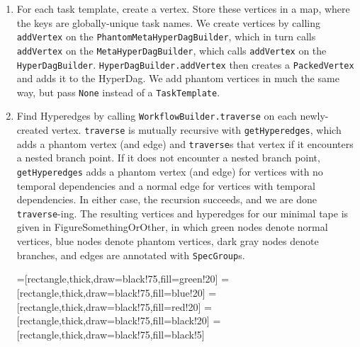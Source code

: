 \documentclass{report}
\begin{document}
\begin{enumerate}

\item For each task template, create a vertex. Store these vertices in a map, where the keys are globally-unique task names.
      We create vertices by calling \texttt{addVertex} on the \texttt{PhantomMetaHyperDagBuilder}, which in turn calls \texttt{addVertex}
      on the \texttt{MetaHyperDagBuilder}, which calls \texttt{addVertex} on the \texttt{HyperDagBuilder}. \texttt{HyperDagBuilder.addVertex}
      then creates a \texttt{PackedVertex} and adds it to the HyperDag. We add phantom vertices in much the same way, but pass \texttt{None}
      instead of a \texttt{TaskTemplate}.

\item Find Hyperedges by calling \texttt{WorkflowBuilder.traverse} on each newly-created vertex. \texttt{traverse} is mutually recursive with
      \texttt{getHyperedges}, which adds a phantom vertex (and edge) and \texttt{traverse}s that vertex if it encounters a
      nested branch point. If it does not encounter a nested branch point, \texttt{getHyperedges} adds a phantom vertex (and
      edge) for vertices with no temporal dependencies and a normal edge for vertices with temporal dependencies. In either
      case, the recursion succeeds, and we are done \texttt{traverse}-ing. The resulting vertices and hyperedges for our minimal
      tape is given in FigureSomethingOrOther, in which green nodes denote normal vertices, blue nodes denote phantom vertices, dark gray
      nodes denote branches, and edges are annotated with \texttt{SpecGroup}s.

=[rectangle,thick,draw=black!75,fill=green!20]
=[rectangle,thick,draw=black!75,fill=blue!20]
=[rectangle,thick,draw=black!75,fill=red!20]
=[rectangle,thick,draw=black!75,fill=black!20]
=[rectangle,thick,draw=black!75,fill=black!5]

\end{enumerate}
\end{document}
